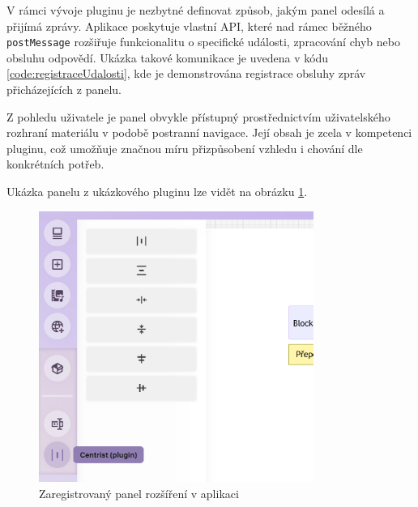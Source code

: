 V rámci vývoje pluginu je nezbytné definovat způsob, jakým panel odesílá a přijímá zprávy. 
Aplikace poskytuje vlastní API, které nad rámec běžného \texttt{postMessage} rozšiřuje funkcionalitu o specifické události, zpracování chyb nebo obsluhu odpovědí. 
Ukázka takové komunikace je uvedena v kódu \ref{code:registraceUdalosti}, kde je demonstrována registrace obsluhy zpráv přicházejících z panelu.

Z pohledu uživatele je panel obvykle přístupný prostřednictvím uživatelského rozhraní materiálu v podobě postranní navigace. 
Její obsah je zcela v kompetenci pluginu, což umožňuje značnou míru přizpůsobení vzhledu i chování dle konkrétních potřeb.

Ukázka panelu z ukázkového pluginu lze vidět na obrázku \ref{fig:realizace/panel}.




\begin{figure}[ht!]
    \centering
    \includegraphics[width=0.8\textwidth]{media/05_realizace/panel.png}
    \caption{Zaregistrovaný panel rozšíření v aplikaci}
    \label{fig:realizace/panel}
\end{figure}



